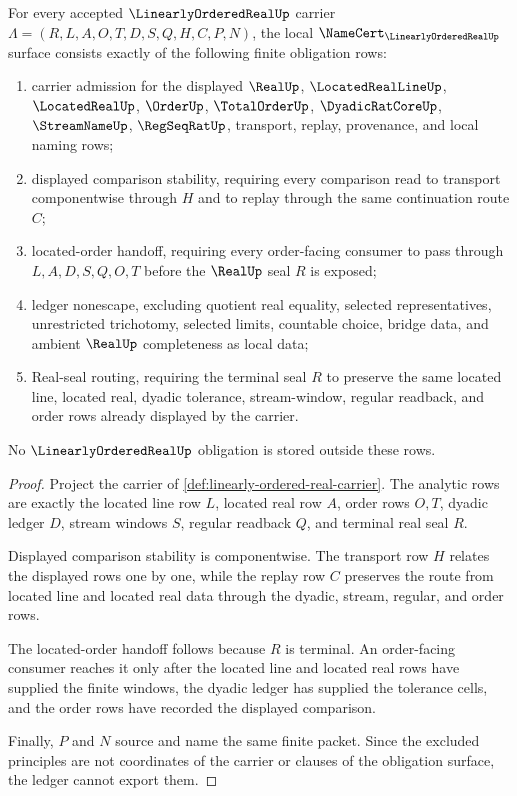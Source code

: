 \begin{theorem}
\label{thm:linearly-ordered-real-namecert-obligations}
For every accepted $\LinearlyOrderedRealUp$ carrier $\Lambda=(R,L,A,O,T,D,S,Q,H,C,P,N)$, the local $\NameCert_{\LinearlyOrderedRealUp}$ surface consists exactly of the following finite obligation rows:
\begin{enumerate}
\item carrier admission for the displayed $\RealUp$, $\LocatedRealLineUp$, $\LocatedRealUp$, $\OrderUp$, $\TotalOrderUp$, $\DyadicRatCoreUp$, $\StreamNameUp$, $\RegSeqRatUp$, transport, replay, provenance, and local naming rows;
\item displayed comparison stability, requiring every comparison read to transport componentwise through $H$ and to replay through the same continuation route $C$;
\item located-order handoff, requiring every order-facing consumer to pass through $L,A,D,S,Q,O,T$ before the $\RealUp$ seal $R$ is exposed;
\item ledger nonescape, excluding quotient real equality, selected representatives, unrestricted trichotomy, selected limits, countable choice, bridge data, and ambient $\RealUp$ completeness as local data;
\item Real-seal routing, requiring the terminal seal $R$ to preserve the same located line, located real, dyadic tolerance, stream-window, regular readback, and order rows already displayed by the carrier.
\end{enumerate}
No $\LinearlyOrderedRealUp$ obligation is stored outside these rows.
\end{theorem}
\begin{proof}
Project the carrier of \autoref{def:linearly-ordered-real-carrier}. The analytic rows are exactly the located line row $L$, located real row $A$, order rows $O,T$, dyadic ledger $D$, stream windows $S$, regular readback $Q$, and terminal real seal $R$.

Displayed comparison stability is componentwise. The transport row $H$ relates the displayed rows one by one, while the replay row $C$ preserves the route from located line and located real data through the dyadic, stream, regular, and order rows.

The located-order handoff follows because $R$ is terminal. An order-facing consumer reaches it only after the located line and located real rows have supplied the finite windows, the dyadic ledger has supplied the tolerance cells, and the order rows have recorded the displayed comparison.

Finally, $P$ and $N$ source and name the same finite packet. Since the excluded principles are not coordinates of the carrier or clauses of the obligation surface, the ledger cannot export them.
\end{proof}

